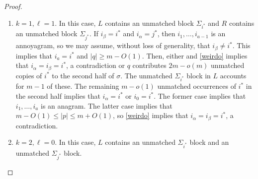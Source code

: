 \documentclass[kpfonts]{patmorin}
\begin{document}
\begin{proof}
\begin{enumerate}
        \item $k= 1,\ell= 1$.  In this case, $L$ contains an unmatched  block $\Sigma_{i^*}$ and $R$ contains an unmatched block $\Sigma_{j^*}$.  If $i_\beta=i^*$ and $i_\alpha=j^*$, then $i_1,\ldots,i_{a-1}$ is an annoyagram, so we may assume, without loss of generality, that $i_\beta\neq i^*$. This implies that $i_a=i^*$ and $|q|\ge m-O(1)$.  Then, either and \cref{weirdo} implies that $i_\alpha=i_\beta=i^*$, a contradiction or $q$ contributes $2m-o(m)$ unmatched copies of $i^*$ to the second half of $\sigma$. The unmatched $\Sigma_{i^*}$ block in $L$ accounts for $m-1$ of these. The remaining $m-o(1)$ unmatched occurrences of $i^*$ in the second half implies that $i_\alpha=i^*$ or $i_0=i^*$.  The former case implies that $i_1,\ldots,i_a$ is an anagram.  The latter case implies that $m-O(1)\le |p|\le m+O(1)$, so \cref{weirdo} implies that $i_{\alpha}=i_{\beta}=i^*$, a contradiction.

        \item $k=2,\ell=0$.  In this case, $L$ contains an unmatched $\Sigma_{i^*}$ block and an unmatched $\Sigma_{j^*}$ block.


\end{enumerate}
\end{proof}
\end{document}
